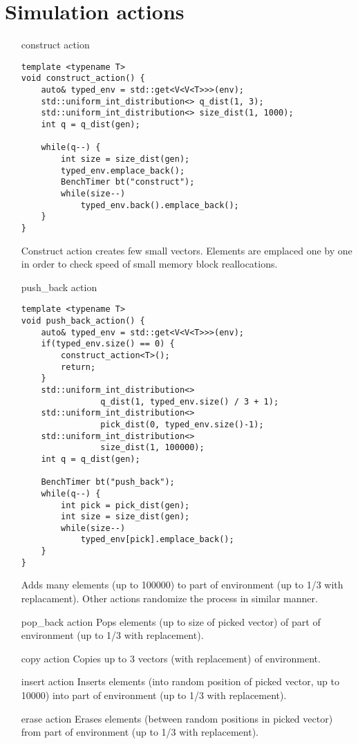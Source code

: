 \documentclass[inz, english, shortabstract]{iithesis}
\begin{document}
\section{Simulation actions}
\begin{itemize}
\item [construct action]
\begin{lstlisting}[caption=construct action]
template <typename T>
void construct_action() {
	auto& typed_env = std::get<V<V<T>>>(env);
	std::uniform_int_distribution<> q_dist(1, 3);
	std::uniform_int_distribution<> size_dist(1, 1000);
	int q = q_dist(gen);
	
	while(q--) {
		int size = size_dist(gen);
		typed_env.emplace_back();
		BenchTimer bt("construct");
		while(size--)
			typed_env.back().emplace_back();
	}
}
\end{lstlisting}
Construct action creates few small vectors. Elements are emplaced one by one in order to check speed of small memory block reallocations. 

\item [push\_back action]
\begin{lstlisting}[caption=push\_back action]
template <typename T>
void push_back_action() {
	auto& typed_env = std::get<V<V<T>>>(env);
	if(typed_env.size() == 0) {
		construct_action<T>();
		return;
	}
	std::uniform_int_distribution<> 
				q_dist(1, typed_env.size() / 3 + 1);
	std::uniform_int_distribution<> 
				pick_dist(0, typed_env.size()-1);
	std::uniform_int_distribution<> 
				size_dist(1, 100000);
	int q = q_dist(gen);
	
	BenchTimer bt("push_back");
	while(q--) {
		int pick = pick_dist(gen);
		int size = size_dist(gen);
		while(size--)
			typed_env[pick].emplace_back();
	}
}
\end{lstlisting}
Adds many elements (up to 100000) to part of environment (up to 1/3 with replacament). Other actions randomize the process in similar manner.

\item [pop\_back action]
Pops elements (up to size of picked vector) of part of environment (up to 1/3 with replacement). 

\item [copy action]
Copies up to 3 vectors (with replacement) of environment.

\item[insert action]
Inserts elements (into random position of picked vector, up to 10000) into part of environment (up to 1/3 with replacement).

\item[erase action]
Erases elements (between random positions in picked vector) from part of environment (up to 1/3 with replacement).
\end{itemize}
\end{document}
